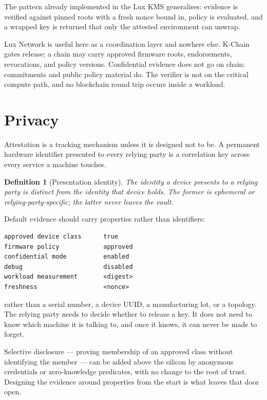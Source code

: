 \documentclass[11pt,a4paper]{article}
\newtheorem{definition}{Definition}[section]
\begin{document}
The pattern already implemented in the Lux KMS generalises: evidence is
verified against pinned roots with a fresh nonce bound in, policy is evaluated,
and a wrapped key is returned that only the attested environment can unwrap.

Lux Network is useful here as a coordination layer and nowhere else. K-Chain
gates release; a chain may carry approved firmware roots, endorsements,
revocations, and policy versions. Confidential evidence does not go on chain;
commitments and public policy material do. The verifier is not on the critical
compute path, and no blockchain round trip occurs inside a workload.

\section{Privacy}\label{sec:privacy}

Attestation is a tracking mechanism unless it is designed not to be. A
permanent hardware identifier presented to every relying party is a
correlation key across every service a machine touches.

\begin{definition}[Presentation identity]
The identity a device presents to a relying party is distinct from the identity
that device holds. The former is ephemeral or relying-party-specific; the
latter never leaves the vault.
\end{definition}

Default evidence should carry properties rather than identifiers:

\begin{lstlisting}
approved device class      true
firmware policy            approved
confidential mode          enabled
debug                      disabled
workload measurement       <digest>
freshness                  <nonce>
\end{lstlisting}

rather than a serial number, a device UUID, a manufacturing lot, or a
topology. The relying party needs to decide whether to release a key. It does
not need to know which machine it is talking to, and once it knows, it can
never be made to forget.

Selective disclosure --- proving membership of an approved class without
identifying the member --- can be added above the silicon by anonymous
credentials or zero-knowledge predicates, with no change to the root of trust.
Designing the evidence around properties from the start is what leaves that
door open.
\end{document}
